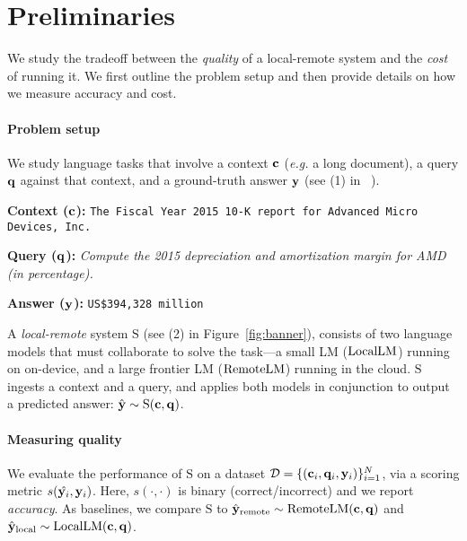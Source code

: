 \section{Preliminaries}
\label{sec:prelim}
\label{sec:prelim-setup}
We study the tradeoff between the \textit{quality} of a local-remote system and the \textit{cost} of running it. We first outline the problem setup and then provide details on how we measure accuracy and cost.


\vspace{-0.5em}\paragraph{Problem setup} We study language tasks that involve a context $\mathbf{c}$ (\textit{e.g.} a long document), a query $\mathbf{q}$ against that context, and a ground-truth answer $\mathbf{y}$ (see (1) in ~).

\begin{examplebox}
\small
\textbf{Context ($\mathbf{c}$):} \texttt{The Fiscal Year 2015 10-K report for Advanced Micro Devices, Inc.}

\textbf{Query ($\mathbf{q}$):} \textit{
    Compute the 2015 depreciation and amortization margin for AMD (in percentage). 
}

\textbf{Answer ($\mathbf{y}$):} \texttt{US\$394,328 million}
\end{examplebox}

A \textit{local-remote} system $\mathrm{S}$ (see (2) in Figure~\ref{fig:banner}), consists of two language models that must collaborate to solve the task---a small LM ($\mathrm{LocalLM}$) running on on-device, and a large frontier LM ($\mathrm{RemoteLM}$) running in the cloud. 
$\mathrm{S}$ ingests a context and a query, and applies both models in conjunction to output a predicted answer: $\hat{\mathbf{y}} \sim \mathrm{S}(\mathbf{c}, \mathbf{q})$. 

\vspace{-0.5em}\paragraph{Measuring quality} We evaluate the performance of $\mathrm{S}$ on a dataset $\mathcal{D} = \{(\mathbf{c}_i, \mathbf{q}_i, \mathbf{y}_i)\}_{i=1}^N$, via a scoring metric $s(\hat{\mathbf{y}_i}, \mathbf{y}_i)$. Here, $s(\cdot, \cdot)$ is binary (correct/incorrect) and we report \textit{accuracy}. As baselines, we compare $\mathrm{S}$ to $ \hat{\mathbf{y}}_{\text{remote}}\sim \mathrm{RemoteLM}(\mathbf{c}, \mathbf{q})$ and $\hat{\mathbf{y}}_{\text{local}} \sim \mathrm{LocalLM}(\mathbf{c}, \mathbf{q})$.

